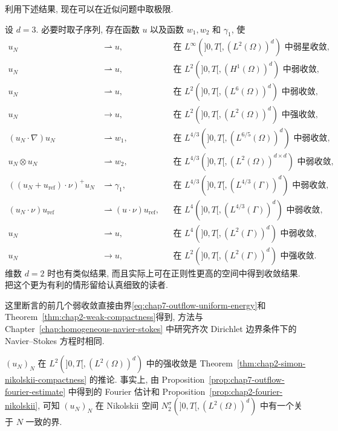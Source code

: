 \begin{sloppypar}
利用下述结果, 现在可以在近似问题中取极限.

\begin{Proposition}
\label{prop:chap7-outflow-weak-convergence}
设 $d=3$. 必要时取子序列, 存在函数 $u$ 以及函数 $w_1,w_2$ 和 $\gamma_1$, 使
\[
\begin{aligned}
 u_N&\rightharpoonup u,
 &&\text{在 }L^\infty(]0,T[,(L^2(\Omega))^d)\text{ 中弱星收敛},\\
 u_N&\rightharpoonup u,
 &&\text{在 }L^2(]0,T[,(H^1(\Omega))^d)\text{ 中弱收敛},\\
 u_N&\rightharpoonup u,
 &&\text{在 }L^2(]0,T[,(L^6(\Omega))^d)\text{ 中弱收敛},\\
 u_N&\longrightarrow u,
 &&\text{在 }L^2(]0,T[,(L^2(\Omega))^d)\text{ 中强收敛},\\
 (u_N\cdot\nabla)u_N&\rightharpoonup w_1,
 &&\text{在 }L^{4/3}(]0,T[,(L^{6/5}(\Omega))^d)\text{ 中弱收敛},\\
 u_N\otimes u_N&\rightharpoonup w_2,
 &&\text{在 }L^{4/3}(]0,T[,(L^2(\Omega))^{d\times d})\text{ 中弱收敛},\\
 ((u_N+u_{\mathrm{ref}})\cdot\nu)^+u_N&\rightharpoonup\gamma_1,
 &&\text{在 }L^{4/3}(]0,T[,(L^{4/3}(\Gamma))^d)\text{ 中弱收敛},\\
 (u_N\cdot\nu)u_{\mathrm{ref}}&\rightharpoonup(u\cdot\nu)u_{\mathrm{ref}},
 &&\text{在 }L^4(]0,T[,(L^{4/3}(\Gamma))^d)\text{ 中弱收敛},\\
 u_N&\rightharpoonup u,
 &&\text{在 }L^4(]0,T[,(L^2(\Gamma))^d)\text{ 中弱收敛},\\
 u_N&\longrightarrow u,
 &&\text{在 }L^2(]0,T[,(L^2(\Gamma))^d)\text{ 中强收敛}.
\end{aligned}
\]
维数 $d=2$ 时也有类似结果, 而且实际上可在正则性更高的空间中得到收敛结果. 把这个更为有利的情形留给认真细致的读者.
\end{Proposition}

\begin{Proof}
这里断言的前几个弱收敛直接由界\eqref{eq:chap7-outflow-uniform-energy}和 Theorem~\ref{thm:chap2-weak-compactness}得到, 方法与 Chapter~\ref{chap:homogeneous-navier-stokes} 中研究齐次 Dirichlet 边界条件下的 Navier--Stokes 方程时相同.

$(u_N)_N$ 在 $L^2(]0,T[,(L^2(\Omega))^d)$ 中的强收敛是 Theorem~\ref{thm:chap2-simon-nikolskii-compactness} 的推论. 事实上, 由 Proposition~\ref{prop:chap7-outflow-fourier-estimate} 中得到的 Fourier 估计和 Proposition~\ref{prop:chap2-fourier-nikolskii}, 可知 $(u_N)_N$ 在 Nikolskii 空间 $N_2^\sigma(]0,T[,(L^2(\Omega))^d)$ 中有一个关于 $N$ 一致的界.


\end{Proof}
\end{sloppypar}
